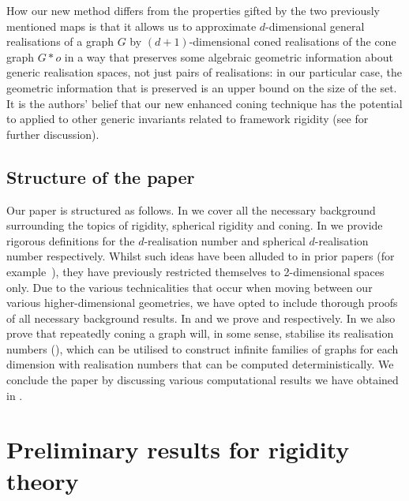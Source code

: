 \documentclass[ALCO]{cedram}
\begin{document}
How our new method differs from the properties gifted by the two previously mentioned maps is that it allows us to approximate $d$-dimensional general realisations of a graph $G$ by $(d+1)$-dimensional coned realisations of the cone graph $G*o$ in a way that preserves some algebraic geometric information about generic realisation spaces, not just pairs of realisations:
in our particular case, the geometric information that is preserved is an upper bound on the size of the set.
It is the authors' belief that our new enhanced coning technique has the potential to applied to other generic invariants related to framework rigidity (see  for further discussion).









\subsection{Structure of the paper}

Our paper is structured as follows.
In  we cover all the necessary background surrounding the topics of rigidity, spherical rigidity and coning.
In  we provide rigorous definitions for the $d$-realisation number and spherical $d$-realisation number respectively.
Whilst such ideas have been alluded to in prior papers (for example~\cite{PlaneCount,JacksonOwen}),
they have previously restricted themselves to 2-dimensional spaces only.
Due to the various technicalities that occur when moving between our various higher-dimensional geometries,
we have opted to include thorough proofs of all necessary background results.
In  and  we prove  and  respectively.
In  we also prove that repeatedly coning a graph will, in some sense, stabilise its realisation numbers (),
which can be utilised to construct infinite families of graphs for each dimension with realisation numbers that can be computed deterministically.
We conclude the paper by discussing various computational results we have obtained in .




\section{Preliminary results for rigidity theory}\label{sec:prelim}
\end{document}
